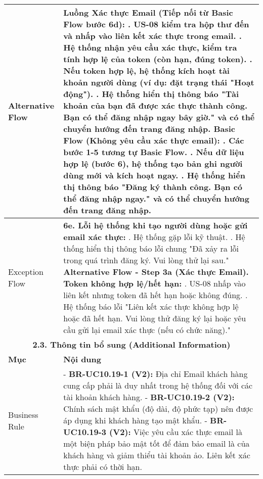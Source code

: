 \begin{longtable}{|m{4cm}|p{11cm}|}
\hline
Alternative Flow & \textbf{Luồng Xác thực Email (Tiếp nối từ Basic Flow bước 6d):} \newline    1. US-08 kiểm tra hộp thư đến và nhấp vào liên kết xác thực trong email. \newline    2. Hệ thống nhận yêu cầu xác thực, kiểm tra tính hợp lệ của token (còn hạn, đúng token). \newline    3. Nếu token hợp lệ, hệ thống kích hoạt tài khoản người dùng (ví dụ: đặt trạng thái "Hoạt động"). \newline    4. Hệ thống hiển thị thông báo "Tài khoản của bạn đã được xác thực thành công. Bạn có thể đăng nhập ngay bây giờ." và có thể chuyển hướng đến trang đăng nhập. \newline \textbf{Basic Flow (Không yêu cầu xác thực email):} \newline    1. Các bước 1-5 tương tự Basic Flow. \newline    2. Nếu dữ liệu hợp lệ (bước 6), hệ thống tạo bản ghi người dùng mới và kích hoạt ngay. \newline    3. Hệ thống hiển thị thông báo "Đăng ký thành công. Bạn có thể đăng nhập ngay." và có thể chuyển hướng đến trang đăng nhập. \\
\hline
Exception Flow & \textbf{6e. Lỗi hệ thống khi tạo người dùng hoặc gửi email xác thực:} \newline    1. Hệ thống gặp lỗi kỹ thuật. \newline    2. Hệ thống hiển thị thông báo lỗi chung "Đã xảy ra lỗi trong quá trình đăng ký. Vui lòng thử lại sau." \newline \textbf{Alternative Flow - Step 3a (Xác thực Email). Token không hợp lệ/hết hạn:} \newline    1. US-08 nhấp vào liên kết nhưng token đã hết hạn hoặc không đúng. \newline    2. Hệ thống báo lỗi "Liên kết xác thực không hợp lệ hoặc đã hết hạn. Vui lòng thử đăng ký lại hoặc yêu cầu gửi lại email xác thực (nếu có chức năng)." \\
\hline
\multicolumn{2}{|c|}{\textbf{2.3. Thông tin bổ sung (Additional Information)}} \\
\hline
\textbf{Mục} & \textbf{Nội dung} \\
\hline
Business Rule & - \textbf{BR-UC10.19-1 (V2):} Địa chỉ Email khách hàng cung cấp phải là duy nhất trong hệ thống đối với các tài khoản khách hàng. \newline - \textbf{BR-UC10.19-2 (V2):} Chính sách mật khẩu (độ dài, độ phức tạp) nên được áp dụng khi khách hàng tạo mật khẩu. \newline - \textbf{BR-UC10.19-3 (V2):} Việc yêu cầu xác thực email là một biện pháp bảo mật tốt để đảm bảo email là của khách hàng và giảm thiểu tài khoản ảo. Liên kết xác thực phải có thời hạn. \\

\end{longtable}
